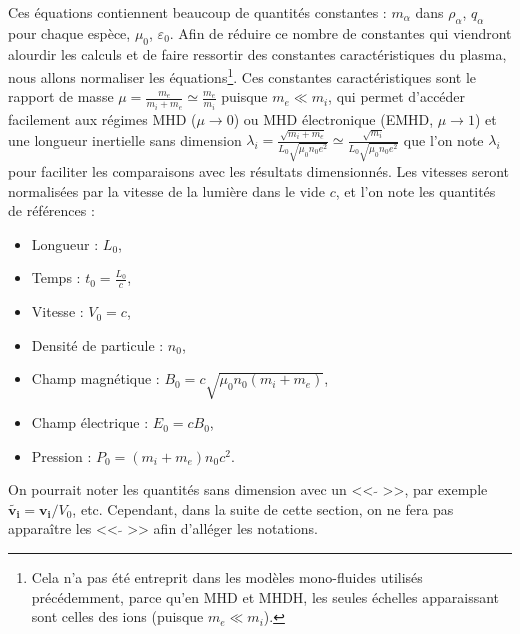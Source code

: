 Ces équations contiennent beaucoup de quantités constantes : $m_{\alpha}$ dans $\rho_{\alpha}$, $q_{\alpha}$ pour chaque espèce, $ \mu_0$, $\varepsilon_0$. Afin de réduire ce nombre de constantes qui viendront alourdir les calculs et de faire ressortir des constantes caractéristiques du plasma, nous allons normaliser les équations\footnote{Cela n'a pas été entreprit dans les modèles mono-fluides utilisés précédemment, parce qu'en \acs{MHD} et \ac{MHDH}, les seules échelles apparaissant sont celles des ions (puisque $m_e \ll m_i$).}. 
Ces constantes caractéristiques sont le rapport de masse $\mu = \frac{m_e}{m_i+m_e} \simeq \frac{m_e}{m_i}$ puisque $m_e \ll m_i$, qui permet d'accéder facilement aux régimes \ac{MHD} ($\mu \rightarrow 0$) ou \ac{MHD} électronique (\acs{EMHD}, $\mu \rightarrow 1$) et une longueur inertielle sans dimension $\lambda_i = \frac{\sqrt{m_i+m_e}}{L_0 \sqrt{\mu_0 n_0 e^2}} \simeq \frac{\sqrt{m_i}}{L_0 \sqrt{\mu_0 n_0 e^2}}$ que l'on note $\lambda_i$ pour faciliter les comparaisons avec les résultats dimensionnés. Les vitesses seront normalisées par la vitesse de la lumière dans le vide $c$, et l'on note les quantités de références :
\begin{itemize}
    \item Longueur : $L_0$,
    \item Temps : $t_0 = \frac{L_0}{c}$,
    \item Vitesse : $V_0 = c$,
    \item Densité de particule : $n_0$,
    \item Champ magnétique : $B_0 = c \sqrt{\mu_0 n_0 (m_i+m_e)}$,
    \item Champ électrique : $E_0 = c B_0$,
    \item Pression : $P_0 = (m_i+m_e)n_0 c^2$.
\end{itemize}
On pourrait noter les quantités sans dimension avec un << $\tilde{}$ >>, par exemple $\tilde{\boldsymbol{v_i}} = \boldsymbol{v_i}/V_0$, etc. Cependant, dans la suite de cette section, on ne fera pas apparaître les << $\tilde{}$ >> afin d'alléger les notations.

